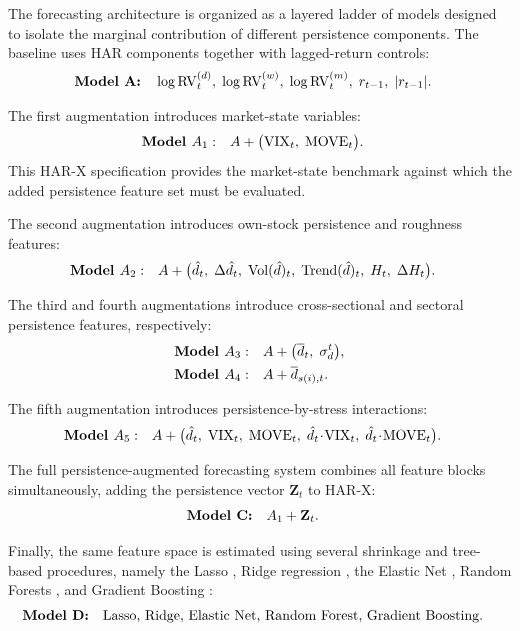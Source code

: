\documentclass[jrfm,article,submit,moreauthors,pdftex]{Definitions/mdpi}
\begin{document}
The forecasting architecture is organized as a layered ladder of models
designed to isolate the marginal contribution of different persistence
components. The baseline uses HAR components together with lagged-return
controls:
\begin{align}
  \textbf{Model A:}\quad
  &\log\mathrm{RV}^{(d)}_t,\;\log\mathrm{RV}^{(w)}_t,\;\log\mathrm{RV}^{(m)}_t,\;r_{t-1},\;|r_{t-1}|.
  \notag
\end{align}

The first augmentation introduces market-state variables:
\begin{align}
  \textbf{Model }A_1:\quad &A + \bigl(\mathrm{VIX}_t,\;\mathrm{MOVE}_t\bigr).
  \notag
\end{align}
This HAR-X specification provides the market-state benchmark against which
the added persistence feature set must be evaluated.

The second augmentation introduces own-stock persistence and roughness
features:
\begin{align}
  \textbf{Model }A_2:\quad
  &A + \bigl( \hat{d}_t,\;\Delta \hat{d}_t,\;\mathrm{Vol}( \hat{d})_t,\;
  \mathrm{Trend}( \hat{d})_t,\;H_t,\;\Delta H_t\bigr).
  \notag
\end{align}

The third and fourth augmentations introduce cross-sectional and sectoral
persistence features, respectively:
\begin{align}
  \textbf{Model }A_3:\quad &A + \bigl(\overline{d}_t,\;\sigma_d^t\bigr),
  \notag\\
  \textbf{Model }A_4:\quad &A + \overline{d}_{s(i),t}.
  \notag
\end{align}

The fifth augmentation introduces persistence-by-stress interactions:
\begin{align}
  \textbf{Model }A_5:\quad
  &A + \bigl( \hat{d}_t,\;\mathrm{VIX}_t,\;\mathrm{MOVE}_t,\;
   \hat{d}_t\!\cdot\!\mathrm{VIX}_t,\; \hat{d}_t\!\cdot\!\mathrm{MOVE}_t\bigr).
  \notag
\end{align}

The full persistence-augmented forecasting system combines all feature blocks
simultaneously, adding the persistence vector $\mathbf Z_t$ to HAR-X:
\begin{align}
  \textbf{Model C:}\quad &A_1 + \mathbf Z_t.
  \notag
\end{align}

Finally, the same feature space is estimated using several shrinkage and
tree-based procedures, namely the Lasso \citep{tibshirani1996regression},
Ridge regression \citep{hoerl1970ridge}, the Elastic Net
\citep{zou2005regularization}, Random Forests \citep{breiman2001random},
and Gradient Boosting \citep{friedman2001greedy}:
\begin{align}
  \textbf{Model D:}\quad
  &\text{Lasso, Ridge, Elastic Net, Random Forest, Gradient Boosting.}
  \notag
\end{align}
\end{document}
